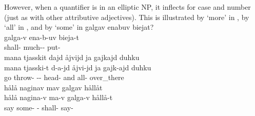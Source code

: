 However, when a quantifier is in an elliptic NP, %
it inflects for case and number (just as with other attributive adjectives). This is illustrated by  ‘more’ in , %
by  ‘all’ in , %
and by  ‘some’ in 
\ea\label{quantifierEx6}
\glll	galgav enabuv biejat?\\
	galga-v ena-b-uv bieja-t\\
	shall- much-- put-\\\nopagebreak
{}	
\z
\ea\label{quantifierEx7}
\glll	mana tjasskit dajd åjvijd ja gajkajd duhku\\
	mana tjasski-t d-a-jd åjvi-jd ja gajk-ajd duhku\\
	go\BS{} throw- -- head- and all- over\_there\\\nopagebreak
{}	
\z
\ea\label{quantifierEx8}
\glll	hålå naginav mav galgav hållåt\\
	hålå nagina-v ma-v galga-v hållå-t\\
	say\BS{} some- - shall- say-\\\nopagebreak
{}	
\z

